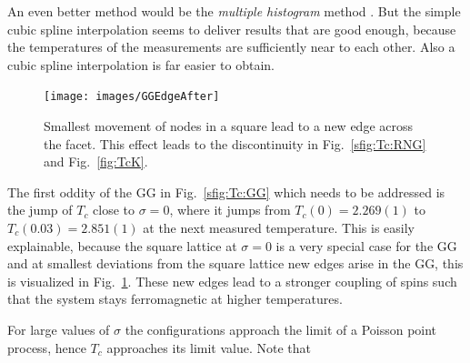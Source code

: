 \documentclass[pre,twocolumn,groupedaddress,showpacs,showkeys,amsmath,amssymb,floatfix]{revtex4-1}
\begin{document}
        An even better method would be the
        \emph{multiple histogram} method \cite[p. 219ff]{NewmanBarkema1999}.
        But the simple cubic spline interpolation seems to deliver results that
        are good enough, because the temperatures of the measurements are
        sufficiently near to each other. Also a cubic spline interpolation is
        far easier to obtain.

        \begin{figure}[hbtp]
            \texttt{[image: images/GGEdgeAfter]}
            \caption
            {
                Smallest movement of nodes in a square lead to a new edge across the
                facet. This effect leads to the discontinuity in Fig.~\ref{sfig:Tc:RNG} and
                Fig.~\ref{fig:TcK}.
            }
            \label{fig:GGEdgeAfter}
        \end{figure}
        The first oddity of the GG in Fig.~\ref{sfig:Tc:GG} which needs to be addressed is
        the jump of $T_c$ close to $\sigma = 0$, where it jumps from $T_c(0) = 2.269(1)$
        to $T_c(0.03) = 2.851(1)$ at the next measured temperature. This is easily explainable,
        because the square lattice at $\sigma = 0$ is a very special case for the
        GG and at smallest deviations from the square lattice new edges arise in
        the GG, this is visualized in Fig.~\ref{fig:GGEdgeAfter}. These new edges lead
        to a stronger coupling of spins such that the system stays ferromagnetic at
        higher temperatures.

        For large values of $\sigma$ the configurations approach the limit of a
        Poisson point process, hence $T_c$ approaches its limit value. Note that
\end{document}
